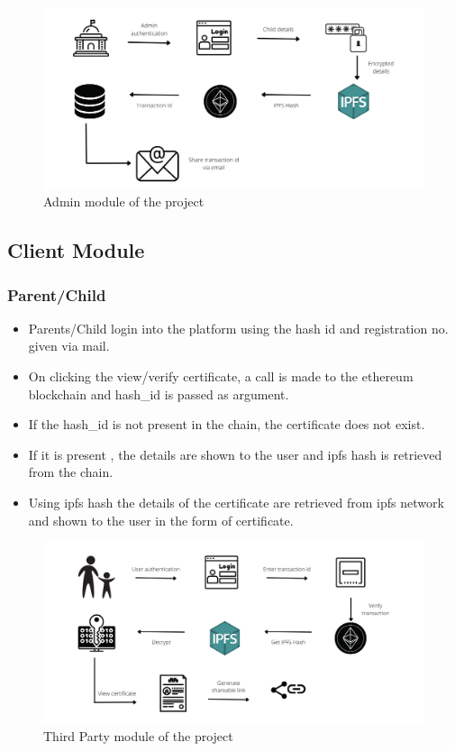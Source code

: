     \begin{figure}[H]
        \centering
        \includegraphics[width=\textwidth]{imgs/Admin_module.png}
        \caption{Admin module of the project}
        \label{fig:Admin module of the project}
        \end{figure}

\subsection{Client Module}
        \subsubsection{Parent/Child}

        \begin{itemize}
            \item Parents/Child login into the platform using the hash id and registration no. given via mail.
            \item On clicking the view/verify certificate, a call is made to the ethereum blockchain and hash\_id is passed as argument.
            \item If the hash\_id is not present in the chain, the certificate does not exist.
            \item If it is present , the details are shown to the user and ipfs hash is retrieved from the chain. 
            \item Using ipfs hash the details of the certificate are retrieved from ipfs network and shown to the user in the form of certificate.
        \end{itemize}
    
        \begin{figure}[H]
            \centering
            \includegraphics[width=\textwidth]{imgs/Child_Parent_module.png}
            \caption{Third Party module of the project}
            \label{fig:Clild/Parent module of the project}
            \end{figure}


